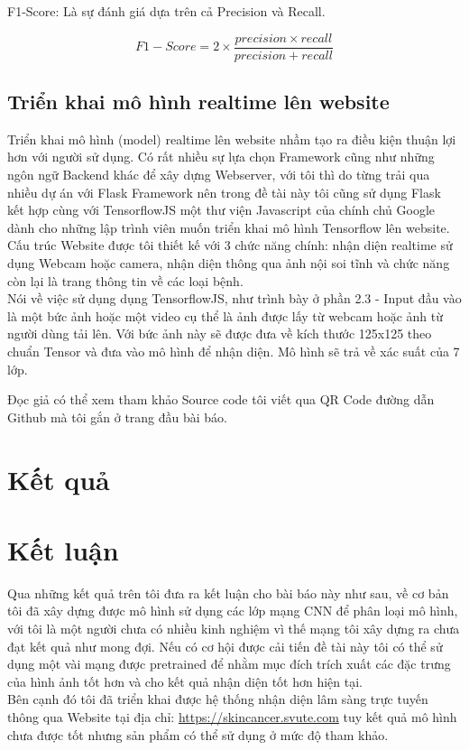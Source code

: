 \documentclass[12pt,a4paper]{article}
\begin{document}
	\noindent
	F1-Score: Là sự đánh giá dựa trên cả Precision và Recall.
	
	\begin{equation}
		F1-Score = 2\times\frac{precision\times recall}{precision + recall}
	\end{equation}
	
	\subsection{Triển khai mô hình realtime lên website}
	Triển khai mô hình (model) realtime lên website nhầm tạo ra điều kiện thuận lợi hơn với người sử dụng. Có rất nhiều sự lựa chọn Framework cũng như những ngôn ngữ Backend khác để xây dựng Webserver, với tôi thì do từng trải qua nhiều dự án với Flask Framework nên trong đề tài này tôi cũng sử dụng Flask kết hợp cùng với TensorflowJS một thư viện Javascript của chính chủ Google dành cho những lập trình viên muốn triển khai mô hình Tensorflow lên website.\\
	
	\noindent
	Cấu trúc Website được tôi thiết kế với 3 chức năng chính: nhận diện realtime sử dụng Webcam hoặc camera, nhận diện thông qua ảnh nội soi tĩnh và chức năng còn lại là trang thông tin về các loại bệnh.\\
	
	\noindent
	Nói về việc sử dụng dụng TensorflowJS, như trình bày ở phần 2.3 - Input đầu vào là một bức ảnh hoặc một video cụ thể là ảnh được lấy từ webcam hoặc ảnh từ người dùng tải lên. Với bức ảnh này sẽ được đưa về kích thước 125x125 theo chuẩn Tensor và đưa vào mô hình để nhận diện. Mô hình sẽ trả về xác suất của 7 lớp.
	
	\noindent
	Đọc giả có thể xem tham khảo Source code tôi viết qua QR Code đường dẫn Github mà tôi gắn ở trang đầu bài báo.
	
	\section{Kết quả}
	
	
	\section{Kết luận}
	Qua những kết quả trên tôi đưa ra kết luận cho bài báo này như sau, về cơ bản tôi đã xây dựng được mô hình sử dụng các lớp mạng CNN để phân loại mô hình, với tôi là một người chưa có nhiều kinh nghiệm vì thế mạng tôi xây dựng ra chưa đạt kết quả như mong đợi. Nếu có cơ hội được cải tiến đề tài này tôi có thể sử dụng một vài mạng được pretrained để nhằm mục đích trích xuất các đặc trưng của hình ảnh tốt hơn và cho kết quả nhận diện tốt hơn hiện tại.\\
	
	\noindent
	Bên cạnh đó tôi đã triển khai được hệ thống nhận diện lâm sàng trực tuyến thông qua Website tại địa chỉ: \href{https://skincancer.svute.com}{https://skincancer.svute.com} tuy kết quả mô hình chưa được tốt nhưng sản phẩm có thể sử dụng ở mức độ tham khảo.
\end{document}
